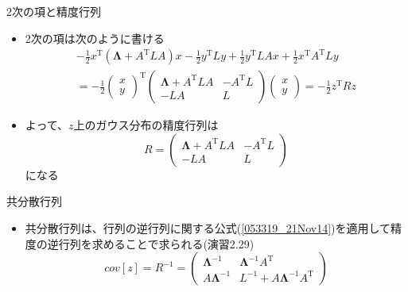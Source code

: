 \begin{frame}{2次の項と精度行列}
 \begin{itemize}
  \item 2次の項は次のように書ける
        \begin{eqnarray}
         -\frac{1}{2}x^{\mathrm{T}}(\bm{\Lambda}+A^{\mathrm{T}}LA)x -\frac{1}{2}y^{\mathrm{T}}Ly+\frac{1}{2}y^{\mathrm{T}}LAx+\frac{1}{2}x^{\mathrm{T}}A^{\mathrm{T}}Ly \nonumber \\
         = -\frac{1}{2}
          \begin{pmatrix}
           x \\
           y
          \end{pmatrix}^{\mathrm{T}}
          \begin{pmatrix}
           \bm{\Lambda}+A^{\mathrm{T}}LA & -A^{\mathrm{T}}L\\
           -LA & L
          \end{pmatrix}
          \begin{pmatrix}
           x \\
           y
          \end{pmatrix}
          = -\frac{1}{2}z^{\mathrm{T}}Rz
        \end{eqnarray}
  \item よって、$z$上のガウス分布の精度行列は
        \begin{equation}
         R=
          \begin{pmatrix}
           \bm{\Lambda}+A^{\mathrm{T}}LA & -A^{\mathrm{T}}L\\
           -LA & L
          \end{pmatrix}
        \end{equation}
        になる
 \end{itemize}
\end{frame}

\begin{frame}{共分散行列}
 \begin{itemize}
  \item 共分散行列は、行列の逆行列に関する公式(\ref{053319_21Nov14})を適用して精度の逆行列を求めることで求られる(演習2.29)
        \begin{equation}
         cov[z]=R^{-1}=
          \begin{pmatrix}
           \bm{\Lambda}^{-1} & \bm{\Lambda}^{-1}A^{\mathrm{T}} \\
           A\bm{\Lambda}^{-1} & L^{-1} + A\bm{\Lambda}^{-1}A^{\mathrm{T}}
          \end{pmatrix}\label{054122_21Nov14}
        \end{equation}
 \end{itemize}
\end{frame}

